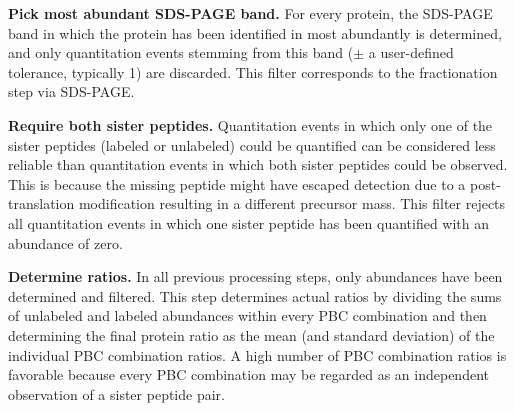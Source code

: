 {\bf Pick most abundant SDS-PAGE band.}
For every protein, the SDS-PAGE band in which the protein has been identified 
in most abundantly is determined, and only quantitation events stemming from 
this band ($\pm$ a user-defined tolerance, typically 1) are discarded. This 
filter corresponds to the fractionation step via SDS-PAGE.

{\bf Require both sister peptides.}
Quantitation events in which only one of the sister peptides (labeled or 
unlabeled) could be quantified can be considered less reliable than quantitation 
events in which both sister peptides could be observed.
This is because the missing peptide might have escaped detection due to a 
post-translation modification resulting in a different precursor mass. 
This filter rejects all quantitation events in which one sister peptide has 
been quantified with an abundance of zero.

{\bf Determine ratios.}
In all previous processing steps, only abundances have been determined and 
filtered. 
This step determines actual ratios by dividing the sums of unlabeled and 
labeled abundances within every PBC combination and then determining the final 
protein ratio as the mean (and standard deviation) of the individual PBC 
combination ratios.
A high number of PBC combination ratios is favorable because every PBC 
combination may be regarded as an independent observation of a sister peptide 
pair.
